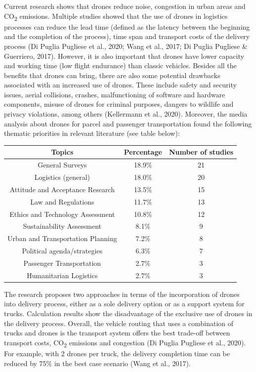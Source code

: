\documentclass[
]{book}
\begin{document}
Current research shows that drones reduce noise, congestion in urban areas and CO\textsubscript{2} emissions. Multiple studies showed that the use of drones in logistics processes can reduce the lead time (defined as the latency between the beginning and the completion of the process), time span and transport costs of the delivery process (Di Puglia Pugliese et al., 2020; Wang et al., 2017; Di Puglia Pugliese \& Guerriero, 2017). However, it is also important that drones have lower capacity and working time (low flight endurance) than classic vehicles.
Besides all the benefits that drones can bring, there are also some potential drawbacks associated with an increased use of drones. These include safety and security issues, aerial collisions, crashes, malfunctioning of software and hardware components, misuse of drones for criminal purposes, dangers to wildlife and privacy violations, among others (Kellermann et al., 2020).
Moreover, the media analysis about drones for parcel and passenger transportation found the following thematic priorities in relevant literature (see table below):

\begin{longtable}[]{@{}ccc@{}}
\toprule
Topics & Percentage & Number of studies\tabularnewline
\midrule
\endhead
General Surveys & 18.9\% & 21\tabularnewline
Logistics (general) & 18.0\% & 20\tabularnewline
Attitude and Acceptance Research & 13.5\% & 15\tabularnewline
Law and Regulations & 11.7\% & 13\tabularnewline
Ethics and Technology Assessment & 10.8\% & 12\tabularnewline
Sustainability Assessment & 8.1\% & 9\tabularnewline
Urban and Transportation Planning & 7.2\% & 8\tabularnewline
Political agenda/strategies & 6.3\% & 7\tabularnewline
Passenger Transportation & 2.7\% & 3\tabularnewline
Humanitarian Logistics & 2.7\% & 3\tabularnewline
\bottomrule
\end{longtable}

The research proposes two approaches in terms of the incorporation of drones into delivery process, either as a sole delivery option or as a support system for trucks. Calculation results show the disadvantage of the exclusive use of drones in the delivery process. Overall, the vehicle routing that uses a combination of trucks and drones is the transport system offers the best trade-off between transport costs, CO\textsubscript{2} emissions and congestion (Di Puglia Pugliese et al., 2020). For example, with 2 drones per truck, the delivery completion time can be reduced by 75\% in the best case scenario (Wang et al., 2017).
\end{document}
